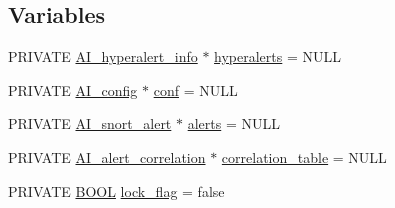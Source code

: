 \subsection*{Variables}
\begin{DoxyCompactItemize}
\item 
PRIVATE \hyperlink{structAI__hyperalert__info}{AI\_\-hyperalert\_\-info} $\ast$ \hyperlink{group__correlation_gae56c79aa018caaeebeeb709a9e51c9c2}{hyperalerts} = NULL
\item 
PRIVATE \hyperlink{structAI__config}{AI\_\-config} $\ast$ \hyperlink{group__correlation_gaad7a982b6016390e7cd1164bd7db8bca}{conf} = NULL
\item 
PRIVATE \hyperlink{struct__AI__snort__alert}{AI\_\-snort\_\-alert} $\ast$ \hyperlink{group__correlation_gae837fc04e61c0eb052f997c54b4fd9fe}{alerts} = NULL
\item 
PRIVATE \hyperlink{structAI__alert__correlation}{AI\_\-alert\_\-correlation} $\ast$ \hyperlink{group__correlation_ga701934a296c51f2397d24e8bf4a9f021}{correlation\_\-table} = NULL
\item 
PRIVATE \hyperlink{spp__ai_8h_a3e5b8192e7d9ffaf3542f1210aec18dd}{BOOL} \hyperlink{group__correlation_gafebc81c042a632dc987e113b7f390274}{lock\_\-flag} = false
\end{DoxyCompactItemize}


